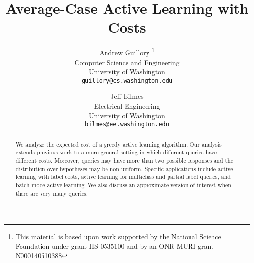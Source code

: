\documentclass{article}
\begin{document}
\title{Average-Case Active Learning with Costs}

\author{Andrew Guillory 
\thanks{This material is based upon work supported by the
National Science Foundation under grant IIS-0535100 and
by an ONR MURI grant N000140510388} \\
Computer Science and Engineering \\
University of Washington \\
\tt{guillory@cs.washington.edu} \\
\and Jeff Bilmes \\
Electrical Engineering \\
University of Washington \\
\tt{bilmes@ee.washington.edu}}




\makecover

\maketitle

\begin{abstract}
We analyze the expected cost of a greedy active learning algorithm.
Our analysis extends previous work to a more general setting in
which different queries have different costs.  Moreover, queries may
have more than two possible responses and the distribution over
hypotheses may be non uniform.  Specific applications include active
learning with label costs, active learning for multiclass and
partial label queries, and batch mode active learning.  We also discuss an
approximate version of interest when there are very many queries.
\end{abstract}
\end{document}
